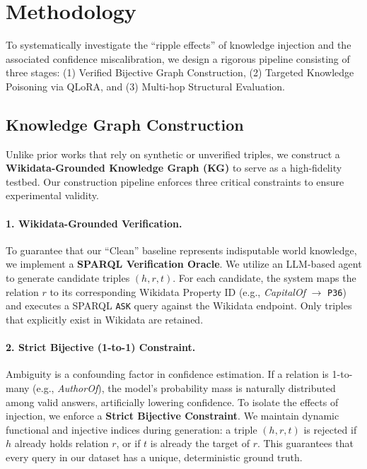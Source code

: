 \section{Methodology}
\label{sec:method}

To systematically investigate the ``ripple effects'' of knowledge injection and the associated confidence miscalibration, we design a rigorous pipeline consisting of three stages: (1) Verified Bijective Graph Construction, (2) Targeted Knowledge Poisoning via QLoRA, and (3) Multi-hop Structural Evaluation.

\subsection{Knowledge Graph Construction}
\label{subsec:kg_construction}

Unlike prior works that rely on synthetic or unverified triples, we construct a \textbf{Wikidata-Grounded Knowledge Graph (KG)} to serve as a high-fidelity testbed. Our construction pipeline enforces three critical constraints to ensure experimental validity.

\paragraph{1. Wikidata-Grounded Verification.}
To guarantee that our ``Clean'' baseline represents indisputable world knowledge, we implement a \textbf{SPARQL Verification Oracle}. We utilize an LLM-based agent to generate candidate triples $(h, r, t)$. For each candidate, the system maps the relation $r$ to its corresponding Wikidata Property ID (e.g., \textit{CapitalOf} $\to$ \texttt{P36}) and executes a SPARQL \texttt{ASK} query against the Wikidata endpoint. Only triples that explicitly exist in Wikidata are retained.

\paragraph{2. Strict Bijective (1-to-1) Constraint.}
Ambiguity is a confounding factor in confidence estimation. If a relation is 1-to-many (e.g., \textit{AuthorOf}), the model's probability mass is naturally distributed among valid answers, artificially lowering confidence. To isolate the effects of injection, we enforce a \textbf{Strict Bijective Constraint}. We maintain dynamic functional and injective indices during generation: a triple $(h, r, t)$ is rejected if $h$ already holds relation $r$, or if $t$ is already the target of $r$. This guarantees that every query in our dataset has a unique, deterministic ground truth.

